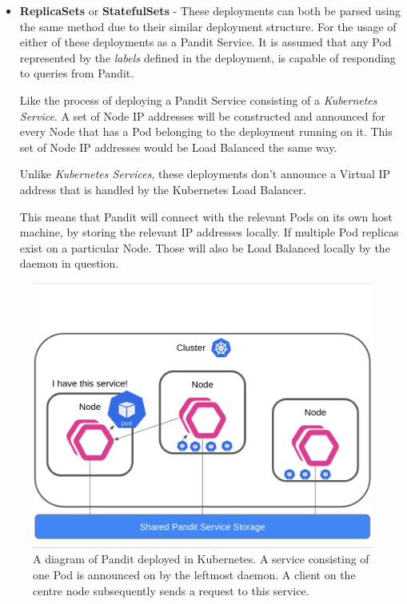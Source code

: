 \documentclass[a4paper,12pt]{report}
\begin{document}
\begin{itemize}
    \item \textbf{ReplicaSets} or \textbf{StatefulSets} - These deployments can both be parsed using the same method due to their similar deployment structure.
    For the usage of either of these deployments as a Pandit Service. It is assumed that any Pod represented by the \textit{labels \cite{labels}} 
    defined in the deployment, is capable of responding to queries from Pandit.
    
    Like the process of deploying a Pandit Service consisting of a \textit{Kubernetes Service}. A set of Node IP addresses will be constructed and 
    announced for every Node that has a Pod belonging to the deployment running on it. This set of Node IP addresses would be Load Balanced the same way.
    
    Unlike \textit{Kubernetes Services}, these deployments don't announce a Virtual IP address \cite{vip} that is handled by the Kubernetes Load Balancer.
    
    This means that Pandit will connect with the relevant Pods on its own host machine, by storing the relevant IP addresses locally. 
    If multiple Pod replicas exist on a particular Node. Those will also be Load Balanced locally by the daemon in question.
    
\end{itemize}
\begin{figure}[hbt!]
    \centering
    \includegraphics[width=\linewidth]{k8s.png}
    \caption{A diagram of Pandit deployed in Kubernetes. A service consisting of one Pod is announced on by the leftmost daemon. A client on the centre node subsequently sends a request to this service.}
\end{figure}
\newpage
\end{document}
